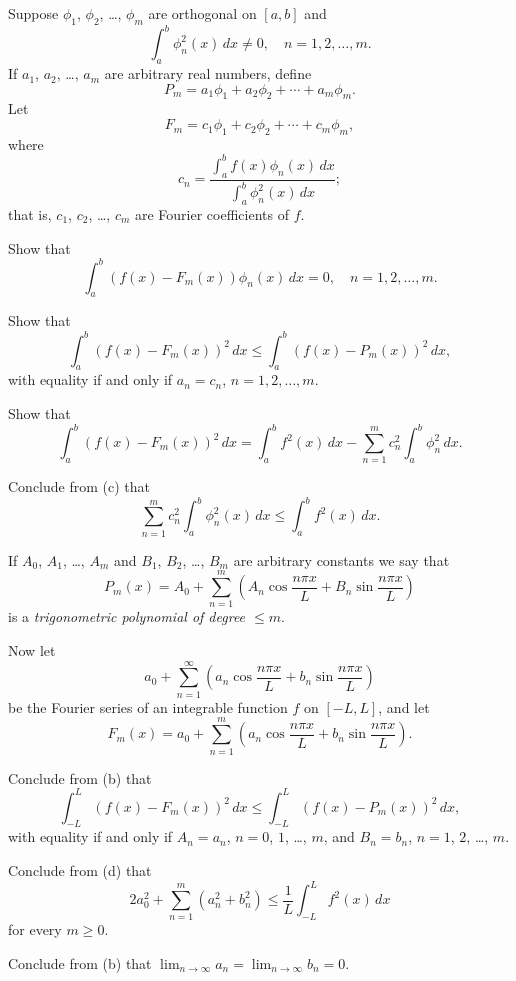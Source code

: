 \begin{exerciselist}
\item\label{exer:11.2.29}Suppose $\phi_1$, $\phi_2$, \dots, $\phi_m$ are orthogonal
on $[a,b]$ and
\[
\int_a^b\phi_n^2(x)\,dx\ne0,\quad n=1,2,\dots,m.
\]
If $a_1$, $a_2$, \dots, $a_m$ are arbitrary real numbers,
define
\[
P_m=a_1\phi_1+a_2\phi_2+\cdots+a_m\phi_m.
\]
Let
\[
F_m=c_1\phi_1+c_2\phi_2+\cdots+c_m\phi_m,
\]
where
\[
c_n=\frac{\int_a^bf(x)\phi_n(x)\,dx}{\int_a^b\phi_n^2(x)\,dx};
\]
that is, $c_1$, $c_2$, \dots, $c_m$ are   Fourier coefficients of
$f$.
\begin{alist}
\item %
Show that
\[
\int_a^b(f(x)-F_m(x))\phi_n(x)\,dx=0,\quad n=1,2,\dots,m.
\]
\item %
Show that
\[
\int_a^b(f(x)-F_m(x))^2\,dx\le
\int_a^b(f(x)-P_m(x))^2\,dx,
\]
with equality if and only if $a_n=c_n$, $n=1,2,\dots, m$.
\item %
Show that
\[
\int_a^b(f(x)-F_m(x))^2\,dx=\int_a^bf^2(x)\,dx-\sum_{n=1}^mc_n^2\int_a^b
\phi_n^2\,dx.
\]
\item %
Conclude from (c) that
\[
\sum_{n=1}^m c_n^2\int_a^b\phi_n^2(x)\,dx\le \int_a^bf^2(x)\,dx.
\]
\end{alist}

\item\label{exer:11.2.30}If $A_0$, $A_1$, \dots, $A_m$ and $B_1$, $B_2$, \dots, $B_m$
are arbitrary constants we say that
\[
P_m(x)=A_0+\sum_{n=1}^m\left(A_n\cos\frac{n\pi x}{L}+B_n\sin\frac{n\pi x}{L}\right)
\]
is a \emph{\color{blue}trigonometric polynomial of degree $\le m$}.

Now let
\[
a_0+\sum_{n=1}^\infty\left(a_n\cos\frac{n\pi x}{L}+b_n\sin\frac{n\pi x}{L}\right)
\]
be the Fourier series of an integrable function $f$ on $[-L,L]$,
and let
\[
F_m(x)=
a_0+\sum_{n=1}^m\left(a_n\cos\frac{n\pi x}{L}+b_n\sin\frac{n\pi x}{L}\right).
\]
\begin{alist}
\item %
Conclude from (b) that
\[
\int_{-L}^L(f(x)-F_m(x))^2\,dx\le
\int_{-L}^L(f(x)-P_m(x))^2\,dx,
\]
with equality if and only if $A_n=a_n$, $n=0$, $1$, \dots, $m$, and
$B_n=b_n$, $n=1$, $2$, \dots, $m$.
\item %
Conclude from (d) that
\[
2a_0^2+\sum_{n=1}^m(a_n^2+b_n^2)\le\frac{1}{L}\int_{-L}^Lf^2(x)\,dx
\]
for every $m\ge0$.
\item %
Conclude from (b) that
$\lim_{n\to\infty}a_n=\lim_{n\to\infty}b_n=0$.
\end{alist}

\end{exerciselist}


